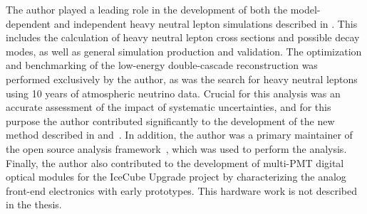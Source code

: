 The author played a leading role in the development of both the model-dependent and independent heavy neutral lepton simulations described in . This includes the calculation of heavy neutral lepton cross sections and possible decay modes, as well as general simulation production and validation. The optimization and benchmarking of the low-energy double-cascade reconstruction was performed exclusively by the author, as was the search for heavy neutral leptons using 10 years of atmospheric neutrino data. Crucial for this analysis was an accurate assessment of the impact of systematic uncertainties, and for this purpose the author contributed significantly to the development of the new method described in  and~. In addition, the author was a primary maintainer of the open source analysis framework~\cite{pisa_software}, which was used to perform the analysis. Finally, the author also contributed to the development of multi-PMT digital optical modules for the IceCube Upgrade project by characterizing the analog front-end electronics with early prototypes. This hardware work is not described in the thesis.
